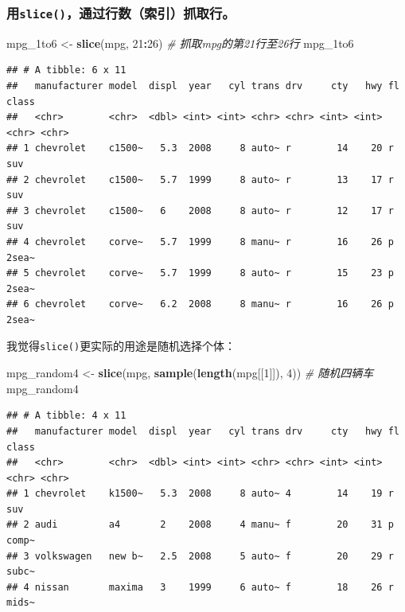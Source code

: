 \documentclass[]{book}
\newenvironment{Shaded}{\begin{snugshade}}{\end{snugshade}}
\newcommand{\CommentTok}[1]{\textcolor[rgb]{0.56,0.35,0.01}{\textit{#1}}}
\newcommand{\DecValTok}[1]{\textcolor[rgb]{0.00,0.00,0.81}{#1}}
\newcommand{\KeywordTok}[1]{\textcolor[rgb]{0.13,0.29,0.53}{\textbf{#1}}}
\newcommand{\NormalTok}[1]{#1}
\newcommand{\OperatorTok}[1]{\textcolor[rgb]{0.81,0.36,0.00}{\textbf{#1}}}
\newcommand{\StringTok}[1]{\textcolor[rgb]{0.31,0.60,0.02}{#1}}
\begin{document}
\hypertarget{slice}{%
\subsubsection{\texorpdfstring{用\texttt{slice()}，通过行数（索引）抓取行。}{用slice()，通过行数（索引）抓取行。}}\label{slice}}

\begin{Shaded}
\begin{Highlighting}[]
\NormalTok{mpg_1to6 <-}\StringTok{ }\KeywordTok{slice}\NormalTok{(mpg, }\DecValTok{21}\OperatorTok{:}\DecValTok{26}\NormalTok{) }\CommentTok{# 抓取mpg的第21行至26行}
\NormalTok{mpg_1to6}
\end{Highlighting}
\end{Shaded}

\begin{verbatim}
## # A tibble: 6 x 11
##   manufacturer model  displ  year   cyl trans drv     cty   hwy fl    class
##   <chr>        <chr>  <dbl> <int> <int> <chr> <chr> <int> <int> <chr> <chr>
## 1 chevrolet    c1500~   5.3  2008     8 auto~ r        14    20 r     suv  
## 2 chevrolet    c1500~   5.7  1999     8 auto~ r        13    17 r     suv  
## 3 chevrolet    c1500~   6    2008     8 auto~ r        12    17 r     suv  
## 4 chevrolet    corve~   5.7  1999     8 manu~ r        16    26 p     2sea~
## 5 chevrolet    corve~   5.7  1999     8 auto~ r        15    23 p     2sea~
## 6 chevrolet    corve~   6.2  2008     8 manu~ r        16    26 p     2sea~
\end{verbatim}

我觉得\texttt{slice()}更实际的用途是随机选择个体：

\begin{Shaded}
\begin{Highlighting}[]
\NormalTok{mpg_random4 <-}\StringTok{ }\KeywordTok{slice}\NormalTok{(mpg, }\KeywordTok{sample}\NormalTok{(}\KeywordTok{length}\NormalTok{(mpg[[}\DecValTok{1}\NormalTok{]]), }\DecValTok{4}\NormalTok{)) }\CommentTok{# 随机四辆车}
\NormalTok{mpg_random4}
\end{Highlighting}
\end{Shaded}

\begin{verbatim}
## # A tibble: 4 x 11
##   manufacturer model  displ  year   cyl trans drv     cty   hwy fl    class
##   <chr>        <chr>  <dbl> <int> <int> <chr> <chr> <int> <int> <chr> <chr>
## 1 chevrolet    k1500~   5.3  2008     8 auto~ 4        14    19 r     suv  
## 2 audi         a4       2    2008     4 manu~ f        20    31 p     comp~
## 3 volkswagen   new b~   2.5  2008     5 auto~ f        20    29 r     subc~
## 4 nissan       maxima   3    1999     6 auto~ f        18    26 r     mids~
\end{verbatim}
\end{document}
